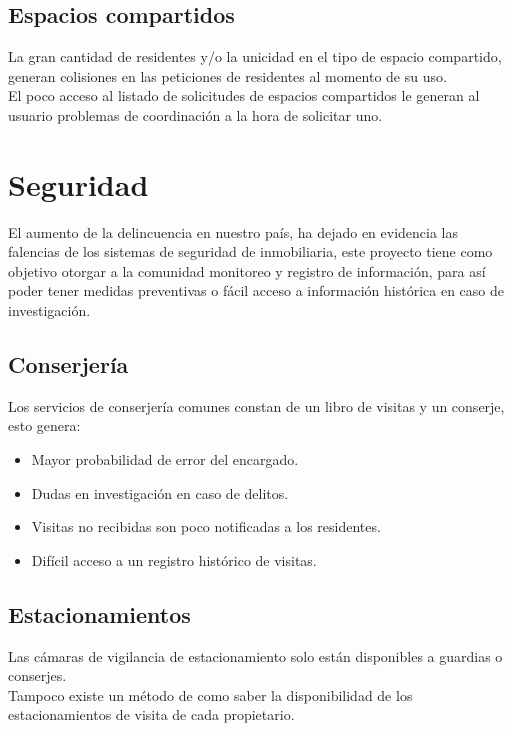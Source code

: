 \subsection{Espacios compartidos}
La gran cantidad de residentes y/o la unicidad en el tipo de espacio compartido, generan colisiones en las peticiones de residentes al momento de su uso.\\
El poco acceso al listado de solicitudes de espacios compartidos le generan al usuario problemas de coordinación a la hora de solicitar uno.
\section{Seguridad}
El aumento de la delincuencia en nuestro país, ha dejado en evidencia las falencias de los sistemas de seguridad de inmobiliaria, este proyecto tiene como objetivo otorgar a la comunidad monitoreo y registro de información, para así poder tener medidas preventivas o fácil acceso a información histórica en caso de investigación.\\ 
\subsection{Conserjería}
Los servicios de conserjería comunes constan de un libro de visitas y un conserje, esto genera:
\begin{itemize}
	\item Mayor probabilidad de error del encargado.
	\item Dudas en investigación en caso de delitos.
	\item Visitas no recibidas son poco notificadas a los residentes.
	\item Difícil acceso a un registro histórico de visitas.
\end{itemize} 
\subsection{Estacionamientos}
Las cámaras de vigilancia de estacionamiento solo están disponibles a guardias o conserjes.\\
Tampoco existe un método de como saber la disponibilidad de los estacionamientos de visita de cada propietario.


